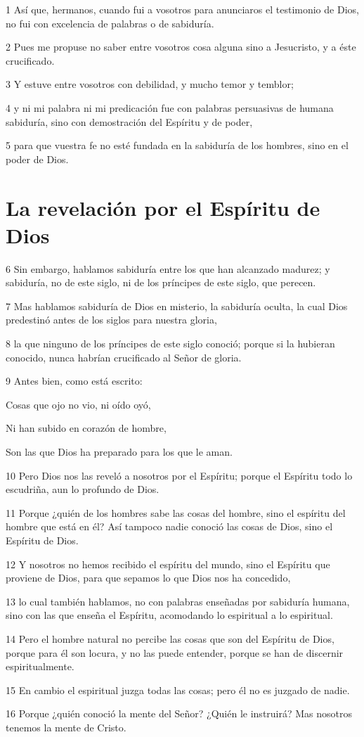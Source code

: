 \par 1 Así que, hermanos, cuando fui a vosotros para anunciaros el testimonio de Dios, no fui con excelencia de palabras o de sabiduría.
\par 2 Pues me propuse no saber entre vosotros cosa alguna sino a Jesucristo, y a éste crucificado.
\par 3 Y estuve entre vosotros con debilidad, y mucho temor y temblor;
\par 4 y ni mi palabra ni mi predicación fue con palabras persuasivas de humana sabiduría, sino con demostración del Espíritu y de poder,
\par 5 para que vuestra fe no esté fundada en la sabiduría de los hombres, sino en el poder de Dios.

\section*{La revelación por el Espíritu de Dios}

\par 6 Sin embargo, hablamos sabiduría entre los que han alcanzado madurez; y sabiduría, no de este siglo, ni de los príncipes de este siglo, que perecen.
\par 7 Mas hablamos sabiduría de Dios en misterio, la sabiduría oculta, la cual Dios predestinó antes de los siglos para nuestra gloria,
\par 8 la que ninguno de los príncipes de este siglo conoció; porque si la hubieran conocido, nunca habrían crucificado al Señor de gloria.
\par 9 Antes bien, como está escrito:
\par Cosas que ojo no vio, ni oído oyó,
\par Ni han subido en corazón de hombre,
\par Son las que Dios ha preparado para los que le aman.
\par 10 Pero Dios nos las reveló a nosotros por el Espíritu; porque el Espíritu todo lo escudriña, aun lo profundo de Dios.
\par 11 Porque ¿quién de los hombres sabe las cosas del hombre, sino el espíritu del hombre que está en él? Así tampoco nadie conoció las cosas de Dios, sino el Espíritu de Dios.
\par 12 Y nosotros no hemos recibido el espíritu del mundo, sino el Espíritu que proviene de Dios, para que sepamos lo que Dios nos ha concedido,
\par 13 lo cual también hablamos, no con palabras enseñadas por sabiduría humana, sino con las que enseña el Espíritu, acomodando lo espiritual a lo espiritual.
\par 14 Pero el hombre natural no percibe las cosas que son del Espíritu de Dios, porque para él son locura, y no las puede entender, porque se han de discernir espiritualmente.
\par 15 En cambio el espiritual juzga todas las cosas; pero él no es juzgado de nadie.
\par 16 Porque ¿quién conoció la mente del Señor? ¿Quién le instruirá? Mas nosotros tenemos la mente de Cristo.

